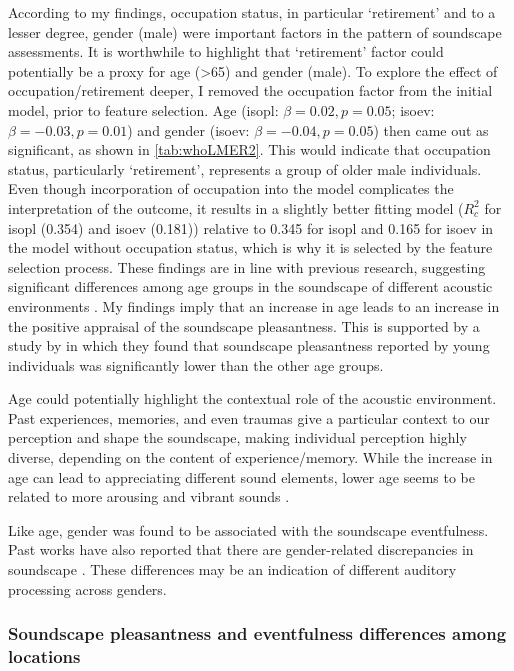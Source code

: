 According to my findings, occupation status, in particular `retirement' and to a lesser degree, gender (male) were important factors in the pattern of soundscape assessments. It is worthwhile to highlight that `retirement' factor could potentially be a proxy for age (>65) and gender (male). To explore the effect of occupation/retirement deeper, I removed the occupation factor from the initial model, prior to feature selection. Age (\gls{isopl}: $\beta=0.02, p=0.05$; \gls{isoev}: $\beta=-0.03, p=0.01$) and gender (\gls{isoev}: $\beta=-0.04, p=0.05$) then came out as significant, as shown in \cref{tab:whoLMER2}. This would indicate that occupation status, particularly `retirement', represents a group of older male individuals. Even though incorporation of occupation into the model complicates the interpretation of the outcome, it results in a slightly better fitting model ($R^2_c$ for \gls{isopl} (0.354) and \gls{isoev} (0.181)) relative to 0.345 for \gls{isopl} and 0.165 for \gls{isoev} in the model without occupation status, which is why it is selected by the feature selection process. These findings are in line with previous research, suggesting significant differences among age groups in the soundscape of different acoustic environments \citep{Ren2016Soundscape,Yang2005Acoustic}. My findings imply that an increase in age leads to an increase in the positive appraisal of the soundscape pleasantness. This is supported by a study by \citet{Aydin2016Assessment} in which they found that soundscape pleasantness reported by young individuals was significantly lower than the other age groups. 

Age could potentially highlight the contextual role of the acoustic environment. Past experiences, memories, and even traumas give a particular context to our perception and shape the soundscape, making individual perception highly diverse, depending on the content of experience/memory. While the increase in age can lead to appreciating different sound elements, lower age seems to be related to more arousing and vibrant sounds \citep{Yang2005Acoustic}.

Like age, gender was found to be associated with the soundscape eventfulness. Past works have also reported that there are gender-related discrepancies in soundscape \citep{Croome1977Noise,Yang2005Acoustic}. These differences may be an indication of different auditory processing across genders.

\subsubsection*{Soundscape pleasantness and eventfulness differences among locations}

